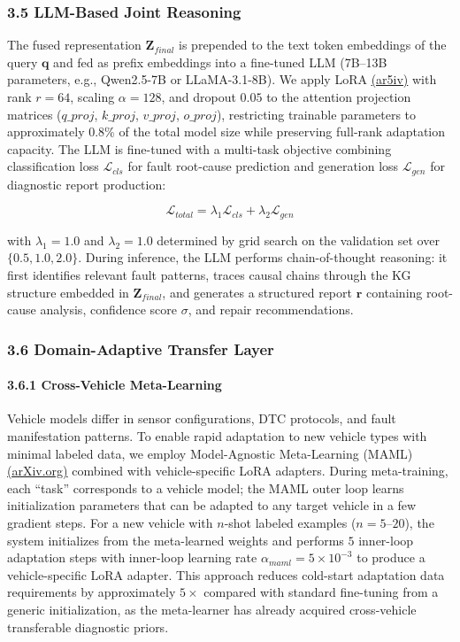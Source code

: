 \documentclass[
  11pt,
]{article}
\begin{document}
\subsubsection{3.5 LLM-Based Joint
Reasoning}\label{llm-based-joint-reasoning}

The fused representation \(\mathbf{Z}_{final}\) is prepended to the text
token embeddings of the query \(\mathbf{q}\) and fed as prefix
embeddings into a fine-tuned LLM (7B--13B parameters, e.g., Qwen2.5-7B
or LLaMA-3.1-8B). We apply LoRA
\href{https://ar5iv.labs.arxiv.org/html/2106.09685}{(ar5iv)} with rank
\(r = 64\), scaling \(\alpha = 128\), and dropout \(0.05\) to the
attention projection matrices (\(q\_proj\), \(k\_proj\), \(v\_proj\),
\(o\_proj\)), restricting trainable parameters to approximately 0.8\% of
the total model size while preserving full-rank adaptation capacity. The
LLM is fine-tuned with a multi-task objective combining classification
loss \(\mathcal{L}_{cls}\) for fault root-cause prediction and
generation loss \(\mathcal{L}_{gen}\) for diagnostic report production:

\[ \mathcal{L}_{total} = \lambda_1 \mathcal{L}_{cls} + \lambda_2 \mathcal{L}_{gen} \tag{9} \]

with \(\lambda_1 = 1.0\) and \(\lambda_2 = 1.0\) determined by grid
search on the validation set over \(\{0.5, 1.0, 2.0\}\). During
inference, the LLM performs chain-of-thought reasoning: it first
identifies relevant fault patterns, traces causal chains through the KG
structure embedded in \(\mathbf{Z}_{final}\), and generates a structured
report \(\mathbf{r}\) containing root-cause analysis, confidence score
\(\sigma\), and repair recommendations.

\subsubsection{3.6 Domain-Adaptive Transfer
Layer}\label{domain-adaptive-transfer-layer}

\paragraph{3.6.1 Cross-Vehicle
Meta-Learning}\label{cross-vehicle-meta-learning}

Vehicle models differ in sensor configurations, DTC protocols, and fault
manifestation patterns. To enable rapid adaptation to new vehicle types
with minimal labeled data, we employ Model-Agnostic Meta-Learning (MAML)
\href{http://arxiv.org/html/2509.01297v1}{(arXiv.org)} combined with
vehicle-specific LoRA adapters. During meta-training, each ``task''
corresponds to a vehicle model; the MAML outer loop learns
initialization parameters that can be adapted to any target vehicle in a
few gradient steps. For a new vehicle with \(n\)-shot labeled examples
(\(n = 5\)--\(20\)), the system initializes from the meta-learned
weights and performs \(5\) inner-loop adaptation steps with inner-loop
learning rate \(\alpha_{maml} = 5 \times 10^{-3}\) to produce a
vehicle-specific LoRA adapter. This approach reduces cold-start
adaptation data requirements by approximately \(5\times\) compared with
standard fine-tuning from a generic initialization, as the meta-learner
has already acquired cross-vehicle transferable diagnostic priors.
\end{document}

